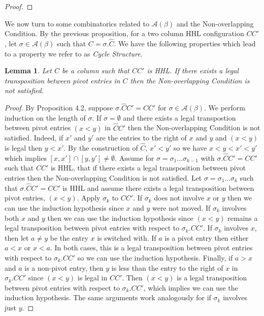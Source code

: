 \documentclass[11pt]{amsart}
\newtheorem{lemma}{Lemma}[section]
\begin{document}
{\begin{proof}
\end{proof}
\indent We now turn to some combinatorics related to $\mathcal{A}(\beta)$ and the Non-overlapping Condition. By the previous proposition, for a two column HHL configuration $CC'$, let $\sigma\in\mathcal{A}(\beta)$ such that $C=\sigma.\widehat{C}$. We have the following properties which lead to a property we refer to as \emph{Cycle Structure}.
\begin{lemma}Let $C$ be a column such that $CC'$ is HHL. If there exists a legal transposition between pivot entries in $C$ then the Non-overlapping Condition is not satisfied. 
\end{lemma}
\begin{proof} By Proposition 4.2, suppose $\sigma.\widehat{C}C'=CC'$ for $\sigma \in \mathcal{A}(\beta)$. We perform induction on the length of $\sigma$. If $\sigma=\emptyset$ and there exists a legal transpostion between pivot entries $(x<y)$ in $\widehat{C}C'$ then the Non-overlapping Condition is not satisfied. Indeed, if $x'$ and $y'$ are the entries to the right of $x$ and $y$ and $(x<y)$ is legal then $y<x'$. By the construction of $\widehat{C}$, $x'<y'$ so we have $x<y<x'<y'$ which implies $[x,x']\cap[y,y']\neq \emptyset$. 
\newline\indent Assume for $\sigma=\sigma_{1}\ldots\sigma_{k-1}$ with $\sigma.\widehat{C}C'=CC'$ such that $CC'$ is HHL, that if there exists a legal transposition between pivot entries then the Non-overlapping Condition is not satisfied. Let $\sigma=\sigma_{1}\ldots\sigma_{k}$ such that $\sigma.\widehat{C}C'=CC'$ is HHL and assume there exists a legal transposition between pivot entries, $(x<y)$. Apply $\sigma_{k}$ to $CC'$. If $\sigma_{k}$ does not involve $x$ or $y$ then we can use the induction hypothesis since $x$ and $y$ were not moved. If $\sigma_{k}$ involves both $x$ and $y$ then we can use the induction hypothesis since $(x<y)$ remains a legal transposition between pivot entries with respect to $\sigma_{k}.CC'$. If $\sigma_{k}$ involves $x$, then let $a\neq y$ be the entry $x$ is switched with. If $a$ is a pivot entry then either $a<x$ or $x<a$. In both cases, this is a legal transposition between pivot entries with respect to $\sigma_{k}.CC'$ so we can use the induction hypothesis. Finally, if $a>x$ and $a$ is a non-pivot entry, then $y$ is less than the entry to the right of $x$ in $\sigma_{k}.CC'$ since $(x<y)$ is legal in $CC'$. Then $(x<y)$ is a legal transposition between pivot entries with respect to $\sigma_{k}.CC'$, which implies we can use the induction hypothesis. The same arguments work analogously for if $\sigma_{k}$ involves just $y$.

\end{proof}}
\end{document}
